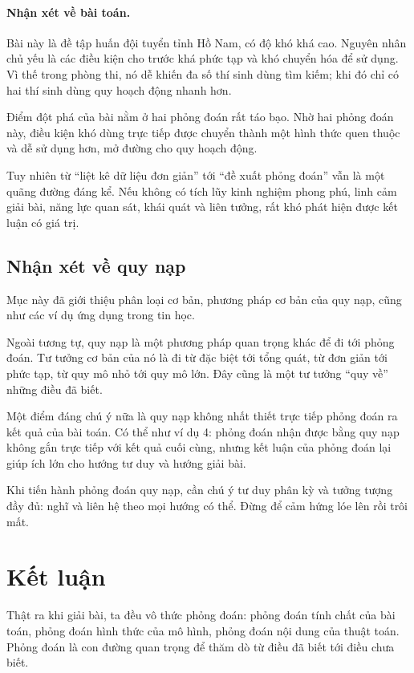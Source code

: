 \documentclass[11pt]{article}
\begin{document}
\paragraph{Nhận xét về bài toán.}
Bài này là đề tập huấn đội tuyển tỉnh Hồ Nam, có độ khó khá cao. Nguyên nhân
chủ yếu là các điều kiện cho trước khá phức tạp và khó chuyển hóa để sử dụng.
Vì thế trong phòng thi, nó dễ khiến đa số thí sinh dùng tìm kiếm; khi đó chỉ
có hai thí sinh dùng quy hoạch động nhanh hơn.

Điểm đột phá của bài nằm ở hai phỏng đoán rất táo bạo. Nhờ hai phỏng đoán
này, điều kiện khó dùng trực tiếp được chuyển thành một hình thức quen thuộc
và dễ sử dụng hơn, mở đường cho quy hoạch động.

Tuy nhiên từ ``liệt kê dữ liệu đơn giản'' tới ``đề xuất phỏng đoán'' vẫn là
một quãng đường đáng kể. Nếu không có tích lũy kinh nghiệm phong phú, linh
cảm giải bài, năng lực quan sát, khái quát và liên tưởng, rất khó phát hiện
được kết luận có giá trị.

\subsection{Nhận xét về quy nạp}

Mục này đã giới thiệu phân loại cơ bản, phương pháp cơ bản của quy nạp, cũng
như các ví dụ ứng dụng trong tin học.

Ngoài tương tự, quy nạp là một phương pháp quan trọng khác để đi tới phỏng
đoán. Tư tưởng cơ bản của nó là đi từ đặc biệt tới tổng quát, từ đơn giản tới
phức tạp, từ quy mô nhỏ tới quy mô lớn. Đây cũng là một tư tưởng ``quy về''
những điều đã biết.

Một điểm đáng chú ý nữa là quy nạp không nhất thiết trực tiếp phỏng đoán ra
kết quả của bài toán. Có thể như ví dụ 4: phỏng đoán nhận được bằng quy nạp
không gắn trực tiếp với kết quả cuối cùng, nhưng kết luận của phỏng đoán lại
giúp ích lớn cho hướng tư duy và hướng giải bài.

Khi tiến hành phỏng đoán quy nạp, cần chú ý tư duy phân kỳ và tưởng tượng đầy
đủ: nghĩ và liên hệ theo mọi hướng có thể. Đừng để cảm hứng lóe lên rồi trôi
mất.

\section{Kết luận}

Thật ra khi giải bài, ta đều vô thức phỏng đoán: phỏng đoán tính chất của bài
toán, phỏng đoán hình thức của mô hình, phỏng đoán nội dung của thuật toán.
Phỏng đoán là con đường quan trọng để thăm dò từ điều đã biết tới điều chưa
biết.
\end{document}
